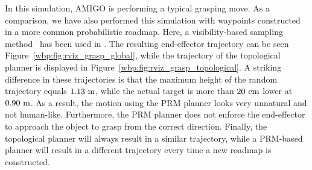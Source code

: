 In this simulation, AMIGO is performing a typical grasping move. As a comparison, we have also performed this simulation with waypoints constructed in a more common probabilistic roadmap. Here, a visibility-based sampling method~\citep{Laumond2000} has been used in . The resulting end-effector trajectory can be seen Figure~\ref{wbp:fig:rviz_grasp_global}, while the trajectory of the topological planner is displayed in Figure~\ref{wbp:fig:rviz_grasp_topological}. A striking difference in these trajectories is that the maximum height of the random trajectory equals $1.13\ \mathrm{m}$, while the actual target is more than $20\ \mathrm{cm}$ lower at $0.90\ \mathrm{m}$. As a result, the motion using the PRM planner looks very unnatural and not human-like. Furthermore, the PRM planner does not enforce the end-effector to approach the object to grasp from the correct direction. Finally, the topological planner will always result in a similar trajectory, while a PRM-based planner will result in a different trajectory every time a new roadmap is constructed.
